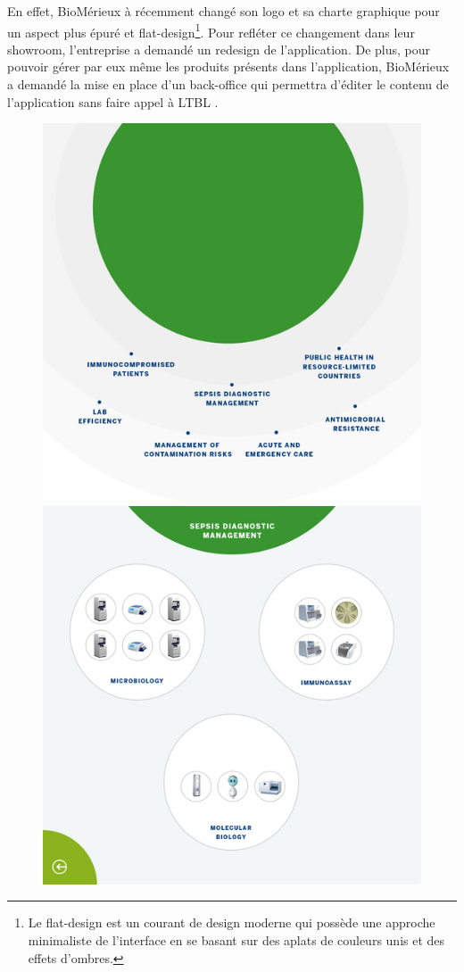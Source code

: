 En effet, BioMérieux à récemment changé son logo et sa charte graphique pour un aspect plus épuré et flat-design\footnote{Le flat-design est un courant de design moderne qui possède une approche minimaliste de l'interface en se basant sur des aplats de couleurs unis et des effets d'ombres.}.
Pour refléter ce changement dans leur showroom, l'entreprise a demandé un redesign de l'application.
De plus, pour pouvoir gérer par eux même les produits présents dans l'application, BioMérieux a demandé la mise en place d'un back-office qui permettra d'éditer le contenu de l'application sans faire appel à LTBL .

\begin{figure}[h]
    \centering
    \includegraphics[scale=0.195]{img/resized-bmx-1-new.jpg}
    \includegraphics[scale=0.195]{img/resized-bmx-2-new.jpg}

\end{figure}
